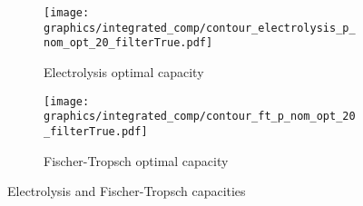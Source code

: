 \begin{figure*}[h] %
    \centering
    \begin{subfigure}[b]{0.45\linewidth}
        \centering
        \texttt{[image: graphics/integrated\_comp/contour\_electrolysis\_p\_nom\_opt\_20\_filterTrue.pdf]}
        \caption{Electrolysis optimal capacity}
        \label{fig:ely-p-nom-opt}
    \end{subfigure}
    \hfill
    \begin{subfigure}[b]{0.45\linewidth}
        \centering
        \texttt{[image: graphics/integrated\_comp/contour\_ft\_p\_nom\_opt\_20\_filterTrue.pdf]}
        \caption{Fischer-Tropsch optimal capacity}
        \label{fig:ft-p-nom-opt}
    \end{subfigure}

    \hfill

    \caption{Electrolysis and Fischer-Tropsch capacities}
    \label{fig:ely-ft-p-nom-opt}
\end{figure*}

\clearpage